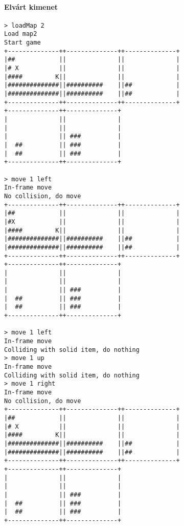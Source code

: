 		        \paragraph*{Elvárt kimenet}
\begin{verbatim}
> loadMap 2
Load map2
Start game
+--------------++--------------++--------------+
|##            ||              ||              |
|# X           ||              ||              |
|####         K||              ||              |
|##############||##########    ||##            |
|##############||##########    ||##            |
+--------------++--------------++--------------+
+--------------++--------------+                
|              ||              |                
|              ||              |                
|              || ###          |                
|  ##          || ###          |                
|  ##          || ###          |                
+--------------++--------------+                

> move 1 left
In-frame move
No collision, do move
+--------------++--------------++--------------+
|##            ||              ||              |
|#X            ||              ||              |
|####         K||              ||              |
|##############||##########    ||##            |
|##############||##########    ||##            |
+--------------++--------------++--------------+
+--------------++--------------+                
|              ||              |                
|              ||              |                
|              || ###          |                
|  ##          || ###          |                
|  ##          || ###          |                
+--------------++--------------+                

> move 1 left
In-frame move
Colliding with solid item, do nothing
> move 1 up
In-frame move
Colliding with solid item, do nothing
> move 1 right
In-frame move
No collision, do move
+--------------++--------------++--------------+
|##            ||              ||              |
|# X           ||              ||              |
|####         K||              ||              |
|##############||##########    ||##            |
|##############||##########    ||##            |
+--------------++--------------++--------------+
+--------------++--------------+                
|              ||              |                
|              ||              |                
|              || ###          |                
|  ##          || ###          |                
|  ##          || ###          |                
+--------------++--------------+                


\end{verbatim}
